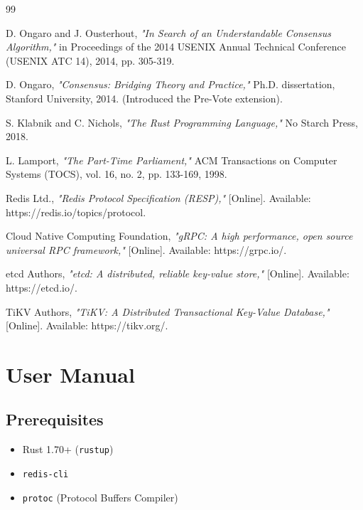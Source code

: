 \documentclass[12pt,a4paper]{report}
\begin{document}
\renewcommand{\bibname}{References}
\begin{thebibliography}{99}

D. Ongaro and J. Ousterhout, \textit{"In Search of an Understandable Consensus Algorithm,"} in Proceedings of the 2014 USENIX Annual Technical Conference (USENIX ATC 14), 2014, pp. 305-319.

D. Ongaro, \textit{"Consensus: Bridging Theory and Practice,"} Ph.D. dissertation, Stanford University, 2014. (Introduced the Pre-Vote extension).

S. Klabnik and C. Nichols, \textit{"The Rust Programming Language,"} No Starch Press, 2018.

L. Lamport, \textit{"The Part-Time Parliament,"} ACM Transactions on Computer Systems (TOCS), vol. 16, no. 2, pp. 133-169, 1998.

Redis Ltd., \textit{"Redis Protocol Specification (RESP),"} [Online]. Available: https://redis.io/topics/protocol.

Cloud Native Computing Foundation, \textit{"gRPC: A high performance, open source universal RPC framework,"} [Online]. Available: https://grpc.io/.

etcd Authors, \textit{"etcd: A distributed, reliable key-value store,"} [Online]. Available: https://etcd.io/.

TiKV Authors, \textit{"TiKV: A Distributed Transactional Key-Value Database,"} [Online]. Available: https://tikv.org/.

\end{thebibliography}

\appendix
\chapter{User Manual}

\section{Prerequisites}
\begin{itemize}
    \item Rust 1.70+ (\texttt{rustup})
    \item \texttt{redis-cli}
    \item \texttt{protoc} (Protocol Buffers Compiler)
\end{itemize}
\end{document}
